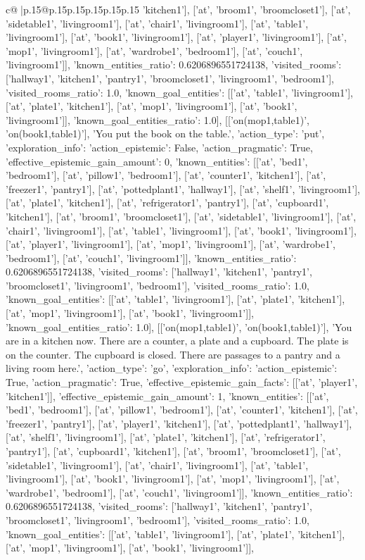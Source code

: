 \documentclass{article}
\begin{document}
{\begin{supertabular}{c@{$\;$}|p{.15\linewidth}@{}p{.15\linewidth}p{.15\linewidth}p{.15\linewidth}p{.15\linewidth}p{.15\linewidth}}
{{{'kitchen1'], ['at', 'broom1', 'broomcloset1'], ['at', 'sidetable1', 'livingroom1'], ['at', 'chair1', 'livingroom1'], ['at', 'table1', 'livingroom1'], ['at', 'book1', 'livingroom1'], ['at', 'player1', 'livingroom1'], ['at', 'mop1', 'livingroom1'], ['at', 'wardrobe1', 'bedroom1'], ['at', 'couch1', 'livingroom1']], 'known_entities_ratio': 0.6206896551724138, 'visited_rooms': ['hallway1', 'kitchen1', 'pantry1', 'broomcloset1', 'livingroom1', 'bedroom1'], 'visited_rooms_ratio': 1.0, 'known_goal_entities': [['at', 'table1', 'livingroom1'], ['at', 'plate1', 'kitchen1'], ['at', 'mop1', 'livingroom1'], ['at', 'book1', 'livingroom1']], 'known_goal_entities_ratio': 1.0}}], [['on(mop1,table1)', 'on(book1,table1)'], 'You put the book on the table.', {'action_type': 'put', 'exploration_info': {'action_epistemic': False, 'action_pragmatic': True, 'effective_epistemic_gain_amount': 0, 'known_entities': [['at', 'bed1', 'bedroom1'], ['at', 'pillow1', 'bedroom1'], ['at', 'counter1', 'kitchen1'], ['at', 'freezer1', 'pantry1'], ['at', 'pottedplant1', 'hallway1'], ['at', 'shelf1', 'livingroom1'], ['at', 'plate1', 'kitchen1'], ['at', 'refrigerator1', 'pantry1'], ['at', 'cupboard1', 'kitchen1'], ['at', 'broom1', 'broomcloset1'], ['at', 'sidetable1', 'livingroom1'], ['at', 'chair1', 'livingroom1'], ['at', 'table1', 'livingroom1'], ['at', 'book1', 'livingroom1'], ['at', 'player1', 'livingroom1'], ['at', 'mop1', 'livingroom1'], ['at', 'wardrobe1', 'bedroom1'], ['at', 'couch1', 'livingroom1']], 'known_entities_ratio': 0.6206896551724138, 'visited_rooms': ['hallway1', 'kitchen1', 'pantry1', 'broomcloset1', 'livingroom1', 'bedroom1'], 'visited_rooms_ratio': 1.0, 'known_goal_entities': [['at', 'table1', 'livingroom1'], ['at', 'plate1', 'kitchen1'], ['at', 'mop1', 'livingroom1'], ['at', 'book1', 'livingroom1']], 'known_goal_entities_ratio': 1.0}}], [['on(mop1,table1)', 'on(book1,table1)'], 'You are in a kitchen now. There are a counter, a plate and a cupboard. The plate is on the counter. The cupboard is closed. There are passages to a pantry and a living room here.', {'action_type': 'go', 'exploration_info': {'action_epistemic': True, 'action_pragmatic': True, 'effective_epistemic_gain_facts': [['at', 'player1', 'kitchen1']], 'effective_epistemic_gain_amount': 1, 'known_entities': [['at', 'bed1', 'bedroom1'], ['at', 'pillow1', 'bedroom1'], ['at', 'counter1', 'kitchen1'], ['at', 'freezer1', 'pantry1'], ['at', 'player1', 'kitchen1'], ['at', 'pottedplant1', 'hallway1'], ['at', 'shelf1', 'livingroom1'], ['at', 'plate1', 'kitchen1'], ['at', 'refrigerator1', 'pantry1'], ['at', 'cupboard1', 'kitchen1'], ['at', 'broom1', 'broomcloset1'], ['at', 'sidetable1', 'livingroom1'], ['at', 'chair1', 'livingroom1'], ['at', 'table1', 'livingroom1'], ['at', 'book1', 'livingroom1'], ['at', 'mop1', 'livingroom1'], ['at', 'wardrobe1', 'bedroom1'], ['at', 'couch1', 'livingroom1']], 'known_entities_ratio': 0.6206896551724138, 'visited_rooms': ['hallway1', 'kitchen1', 'pantry1', 'broomcloset1', 'livingroom1', 'bedroom1'], 'visited_rooms_ratio': 1.0, 'known_goal_entities': [['at', 'table1', 'livingroom1'], ['at', 'plate1', 'kitchen1'], ['at', 'mop1', 'livingroom1'], ['at', 'book1', 'livingroom1']], }}}
\end{supertabular}}
\end{document}
